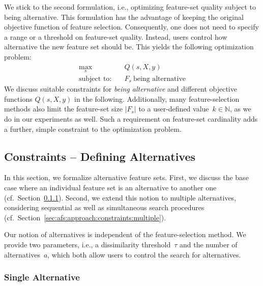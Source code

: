 \documentclass{article}
\theoremstyle{definition}
\begin{document}
We stick to the second formulation, i.e., optimizing feature-set quality subject to being alternative.
This formulation has the advantage of keeping the original objective function of feature selection.
Consequently, one does not need to specify a range or a threshold on feature-set quality.
Instead, users control how alternative the new feature set should be.
This yields the following optimization problem:
%
\begin{equation}
	\begin{aligned}
		\max_s &\quad Q(s,X,y) \\
		\text{subject to:} &\quad F_s~\text{being alternative}
	\end{aligned}
	\label{eq:afs:afs-general}
\end{equation}
%
We discuss suitable constraints for \emph{being alternative} and different objective functions $Q(s,X,y)$ in the following.
Additionally, many feature-selection methods also limit the feature-set size $|F_s|$ to a user-defined value~$k \in \mathbb{N}$, as we do in our experiments as well.
Such a requirement on feature-set cardinality adds a further, simple constraint to the optimization problem.

\subsection{Constraints -- Defining Alternatives}
\label{sec:afs:approach:constraints}

In this section, we formalize alternative feature sets.
First, we discuss the base case where an individual feature set is an alternative to another one (cf.~Section~\ref{sec:afs:approach:constraints:single}).
Second, we extend this notion to multiple alternatives, considering sequential as well as simultaneous search procedures (cf.~Section~\ref{sec:afs:approach:constraints:multiple}).

Our notion of alternatives is independent of the feature-selection method.
We provide two parameters, i.e., a dissimilarity threshold~$\tau$ and the number of alternatives~$a$, which both allow users to control the search for alternatives.

\subsubsection{Single Alternative}
\label{sec:afs:approach:constraints:single}
\end{document}
